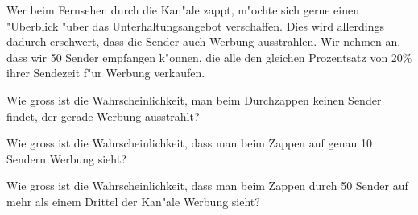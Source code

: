 Wer beim Fernsehen durch die Kan"ale zappt, m"ochte sich gerne einen
"Uberblick "uber das Unterhaltungsangebot verschaffen.  Dies wird allerdings dadurch erschwert, dass die Sender
auch Werbung ausstrahlen. Wir nehmen an, dass wir 50 Sender empfangen
k"onnen, die alle den gleichen Prozentsatz von 20\%
ihrer Sendezeit f"ur Werbung verkaufen.
\begin{teilaufgaben}
\item
Wie gross ist die Wahrscheinlichkeit, man beim Durchzappen
keinen Sender findet, der gerade Werbung ausstrahlt?
\item
Wie gross ist die Wahrscheinlichkeit, dass man beim Zappen auf
genau 10 Sendern Werbung sieht?
\item
Wie gross ist die Wahrscheinlichkeit, dass man beim Zappen durch
50 Sender auf mehr als einem Drittel der Kan"ale Werbung sieht?
\end{teilaufgaben}

